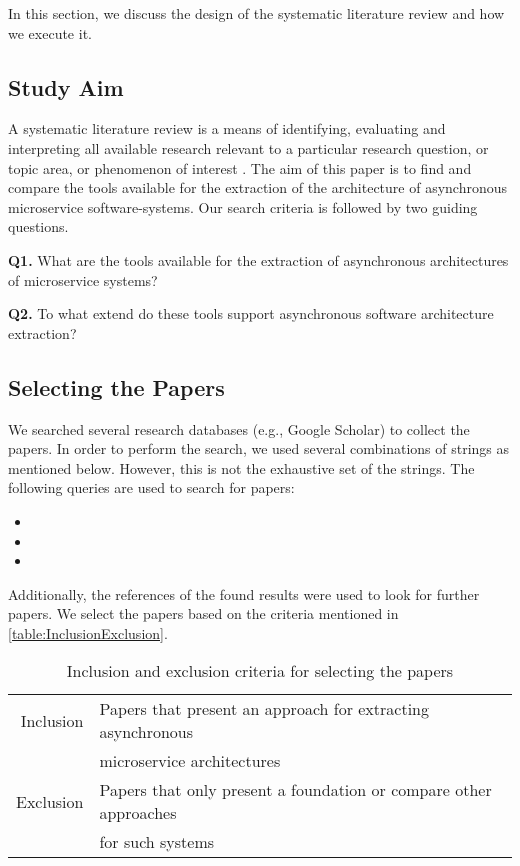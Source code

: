 In this section, we discuss the design of the systematic literature review and how we execute it.

\subsection{Study Aim}
\label{sec:StudyDesign:StudyAim}
A systematic literature review is a means of identifying, evaluating and interpreting all available research relevant to a particular research question, or topic area, or phenomenon of interest \cite{Keele2007guidelines}.
The aim of this paper is to find and compare the tools available for the extraction of the architecture of asynchronous microservice software-systems.
Our search criteria is followed by two guiding questions.

\textbf{Q1.} What are the tools available for the extraction of asynchronous architectures of microservice systems?

\textbf{Q2.} To what extend do these tools support asynchronous software architecture extraction?

\subsection{Selecting the Papers}
\label{sec:StudyDesign:SelectingPapers}
We searched several research databases (e.g., Google Scholar) to collect the papers.
In order to perform the search, we used several combinations of strings as mentioned below.
However, this is not the exhaustive set of the strings.
The following queries are used to search for papers:
\begin{itemize}
	\item {}
	\item {}
	\item {}
\end{itemize}

Additionally, the references of the found results were used to look for further papers.
We select the papers based on the criteria mentioned in \autoref{table:InclusionExclusion}.


\begin{table}
\centering
\begin{tabular}{r l}
\toprule
Inclusion
& Papers that present an approach for extracting asynchronous \\
& microservice architectures \\
\midrule
Exclusion
& Papers that only present a foundation or compare other approaches \\
& for such systems \\
\bottomrule
\end{tabular}
\caption{Inclusion and exclusion criteria for selecting the papers}
\label{table:InclusionExclusion}
\end{table}



